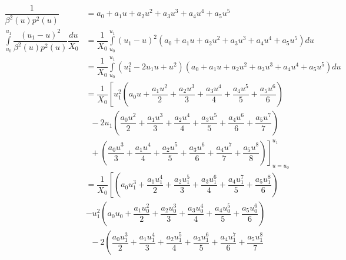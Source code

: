 \documentclass{article}
\begin{document}
\begin{align*}
    \dfrac{1}{\beta^2(u) p^2(u)} &= a_0 +a_1u + a_2u^2+a_3u^3+a_4u^4+a_5u^5\\
    \int\limits_{u_0}^{u_1} \dfrac{\left(u_1-u\right)^2}{\beta^2(u) p^2(u)}\dfrac{du}{X_0} &= \dfrac{1}{X_0}\int\limits_{u_0}^{u_1}\left(u_1-u\right)^2\left(a_0 +a_1u + a_2u^2+a_3u^3+a_4u^4+a_5u^5\right)du\\
    &= \dfrac{1}{X_0}\int\limits_{u_0}^{u_1} \left(u_1^2-2u_1u + u^2\right)\left(a_0 +a_1u + a_2u^2+a_3u^3+a_4u^4+a_5u^5\right)du\\
    &= \dfrac{1}{X_0}
    \left[
        u_1^2
        \left(
            a_0u + \dfrac{a_1u^2}{2} + \dfrac{a_2u^3}{3} + \dfrac{a_3u^4}{4} + \dfrac{a_4u^5}{5} + \dfrac{a_5u^6}{6}
        \right)
    \right.
    \\
        &\;\; - 2u_1
        \left(
            \dfrac{a_0u^2}{2} + \dfrac{a_1u^3}{3} + \dfrac{a_2u^4}{4} + \dfrac{a_3u^5}{5} + \dfrac{a_4u^6}{6} + \dfrac{a_5u^7}{7}
        \right)
    \\
    &
    \left.
        \;\; +
        \left(
            \dfrac{a_0u^3}{3} + \dfrac{a_1u^4}{4} + \dfrac{a_2u^5}{5} + \dfrac{a_3u^6}{6} + \dfrac{a_4u^7}{7} + \dfrac{a_5u^8}{8}
        \right)
    \right]_{u=u_0}^{u_1}
    \\
    &= \dfrac{1}{X_0}
    \left[
        \left(
            a_0u_1^3 + \dfrac{a_1u_1^4}{2} + \dfrac{a_2u_1^5}{3} + \dfrac{a_3u_1^6}{4} + \dfrac{a_4u_1^7}{5} + \dfrac{a_5u_1^8}{6}
        \right)
    \right.
    \\
    &
        - u_1^2
        \left(
            a_0u_0 + \dfrac{a_1u_0^2}{2} + \dfrac{a_2u_0^3}{3} + \dfrac{a_3u_0^4}{4} + \dfrac{a_4u_0^5}{5} + \dfrac{a_5u_0^6}{6}
        \right)
    \\
        &\;\; - 2
        \left(
            \dfrac{a_0u_1^3}{2} + \dfrac{a_1u_1^4}{3} + \dfrac{a_2u_1^5}{4} + \dfrac{a_3u_1^6}{5} + \dfrac{a_4u_1^7}{6} + \dfrac{a_5u_1^8}{7}

\end{align*}
\end{document}
